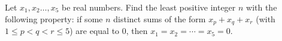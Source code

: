 Let $x_1, x_2 \ldots , x_5$ be real numbers. Find the least positive integer $n$ with the following property: if some $n$ distinct sums of the form $x_p+x_q+x_r$ (with $1\le p<q<r\le 5$) are equal to $0$, then $x_1=x_2=\cdots=x_5=0$.